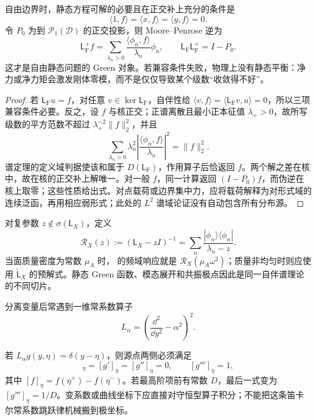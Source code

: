 \begin{proposition}[自由板静态兼容与伪逆]
自由边界时，静态方程可解的必要且在正交补上充分的条件是
\begin{equation}
 \langle1,f\rangle=\langle x,f\rangle=\langle y,f\rangle=0.
 \label{eq:phys-cont-free-load-compatibility}
\end{equation}
令 \(P_0\) 为到 \(\mathcal P_1(\mathcal D)\) 的正交投影，则 Moore--Penrose 逆为
\begin{equation}
 \mathsf L_{\mathrm F}^{+}f
 =\sum_{\lambda_n>0}\frac{\langle\phi_n,f\rangle}{\lambda_n}\phi_n,
 \qquad
 \mathsf L_{\mathrm F}\mathsf L_{\mathrm F}^{+}=I-P_0.
 \label{eq:phys-cont-free-pseudoinverse}
\end{equation}
这才是自由静态问题的 Green 对象。若兼容条件失败，物理上没有静态平衡：净力或净力矩会激发刚体零模，而不是仅仅导致某个级数“收敛得不好”。

\end{proposition}

\begin{proof}
若 $\mathsf L_{\mathrm F}u=f$，对任意 $v\in\ker\mathsf L_{\mathrm F}$，自伴性给
$\langle v,f\rangle=\langle\mathsf L_{\mathrm F}v,u\rangle=0$，所以三项兼容条件必要。反之，设 $f$ 与核正交；正谱离散且最小正本征值 $\lambda_+>0$，故所写级数的平方范数不超过 $\lambda_+^{-2}\|f\|_2^2$，并且
\[
 \sum_{\lambda_n>0}\lambda_n^2
 \left|\frac{\langle\phi_n,f\rangle}{\lambda_n}\right|^2=\|f\|_2^2.
\]
谱定理的定义域判据使该和属于 $D(\mathsf L_{\mathrm F})$，作用算子后恰返回 $f$。两个解之差在核中，故在核的正交补上解唯一。对一般 $f$，同一计算返回 $(I-P_0)f$，而伪逆在核上取零；这些性质给出式。对点载荷或边界集中力，应将载荷解释为对形式域的连续泛函，再用相应弱形式；此处的 $L^2$ 谱域论证没有自动包含所有分布源。
\end{proof}

对复参数 \(z\notin\sigma(\mathsf L_X)\)，定义
\begin{equation}
 \mathscr R_X(z):=(\mathsf L_X-zI)^{-1}
 =\sum_n\frac{|\phi_n\rangle\langle\phi_n|}{\lambda_n-z}.
 \label{eq:phys-cont-biharmonic-resolvent}
\end{equation}
当面质量密度为常数 \(\mu_A\) 时， 的频域响应就是 \(\mathscr R_X(\mu_A\omega^2)\)；质量非均匀时则应使用 \(\widetilde{\mathsf L}_X\) 的预解式。静态 Green 函数、模态展开和共振极点因此是同一自伴谱理论的不同切片。

分离变量后常遇到一维常系数算子
\[
 L_\alpha=\left(\frac{\dd^2}{\dd y^2}-\alpha^2\right)^2.
\]
\begin{proposition}
若 \(L_\alpha g(y,\eta)=\delta(y-\eta)\)，则源点两侧必须满足
\begin{equation}
 [g]_\eta=[g']_\eta=[g'']_\eta=0,
 \qquad
 [g''']_\eta=1,
 \label{eq:phys-cont-fourth-order-green-jump}
\end{equation}
其中 \([f]_\eta=f(\eta^+)-f(\eta^-)\)。若最高阶项前有常数 \(D\)，最后一式变为 \([g''']_\eta=1/D\)。变系数或曲线坐标下应直接对守恒型算子积分；不能把这条笛卡尔常系数跳跃律机械搬到极坐标。

\end{proposition}

